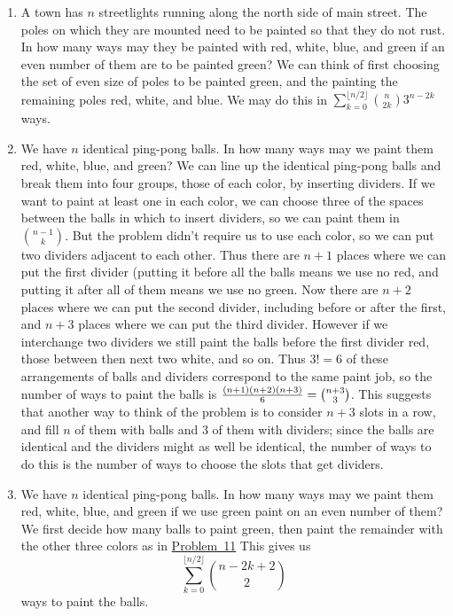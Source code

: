 \documentclass[10pt,]{book}
\theoremstyle{plain}
\theoremstyle{definition}
\numberwithin{equation}{chapter}
\begin{document}
\begin{enumerate}
%
\item\hypertarget{li-10}{}A town has \(n\) streetlights running along the north side of main street.  The poles on which they are mounted need to be painted so that they do not rust.  In how many ways may they be painted with red, white, blue, and green if an even number of them are to be painted green? We can think of first choosing the set of even size of poles to be painted green, and the painting the remaining poles red, white, and blue. We may do this in \(\sum_{k=0}^{\lfloor n/2\rfloor}{n\choose 2k}3^{n-2k}\) ways.%
%
\item\hypertarget{pingpongpaint}{}We have \(n\) identical ping-pong balls.  In how many ways may we paint them red, white, blue, and green? We can line up the identical ping-pong balls and break them into four groups, those of each color, by inserting dividers. If we want to paint at least one in each color, we can choose three of the spaces between the balls in which to insert dividers, so we can paint them in \(n-1\choose k\). But the problem didn't require us to use each color, so we can put two dividers adjacent to each other. Thus there are \(n+1\) places where we can put the first divider (putting it before all the balls means we use no red, and putting it after all of them means we use no green. Now there are \(n+2\) places where we can put the second divider, including before or after the first, and \(n+3\) places where we can put the third divider. However if we interchange two dividers we still paint the balls before the first divider red, those between then next two white, and so on. Thus \(3!=6\) of these arrangements of balls and dividers correspond to the same paint job, so the number of ways to paint the balls is \({(n+1)(n+2)(n+3)\over6} ={n+3\choose
3}\). This suggests that another way to think of the problem is to consider \(n+3\) slots in a row, and fill \(n\) of them with balls and \(3\) of them with dividers; since the balls are identical and the dividers might as well be identical, the number of ways to do this is the number of ways to choose the slots that get dividers.%
%
\item\hypertarget{li-12}{}We have \(n\) identical ping-pong balls.  In how many ways may we paint them red, white, blue, and green if we use green paint on an even number of them? We first decide how many balls to paint green, then paint the remainder with the other three colors as in \hyperlink{pingpongpaint}{Problem~11} This gives us%
\begin{equation*}
\sum_{k=0}^{\lfloor n/2\rfloor}{n-2k+2\choose 2}
\end{equation*}
ways to paint the balls.%
%
\end{enumerate}
\typeout{************************************************}
\typeout{************************************************}
\end{document}
